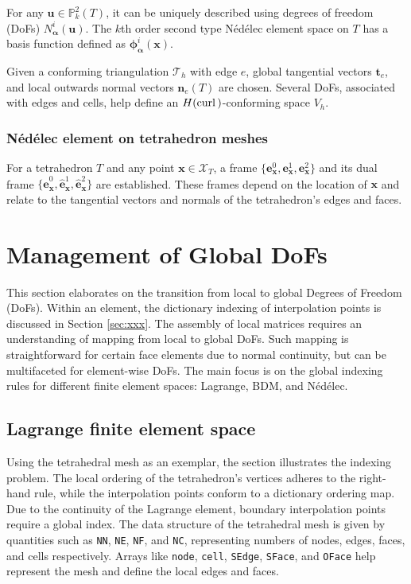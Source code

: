 \documentclass[12pt, a4paper]{article}
\newcommand{\bs}{\boldsymbol}
\newcommand{\curl}{{\rm curl\,}}
\begin{document}
For any \( \bs u \in \mathbb P_k^2(T) \), it can be uniquely described using degrees of freedom (DoFs) \( N^i_{\bs \alpha }(\bs u) \). The \( k \)th order second type N\'ed\'elec element space on \( T \) has a basis function defined as \( \bs{\phi}_{\bs \alpha}^i(\bs x) \).

Given a conforming triangulation \( \mathcal T_h \) with edge \( e \), global tangential vectors \( \bs t_e \), and local outwards normal vectors \( \bs n_e(T) \) are chosen. Several DoFs, associated with edges and cells, help define an \( H(\curl) \)-conforming space \( V_h \).

\subsubsection{N\'ed\'elec element on tetrahedron meshes}
For a tetrahedron \( T \) and any point \( \bs x \in \mathcal X_{T} \), a frame \( \{\bs e_{\boldsymbol x}^0, \bs e_{\bs x}^1, \bs e_{\bs x}^2\} \) and its dual frame \( \{\hat {\bs e}_{\bs x}^0, \hat{\bs e}_{\bs x}^1, \hat{\bs e}_{\bs x}^2\} \) are established. These frames depend on the location of \( \boldsymbol{x} \) and relate to the tangential vectors and normals of the tetrahedron's edges and faces.

\section{Management of Global DoFs}
This section elaborates on the transition from local to global Degrees of Freedom (DoFs). Within an element, the dictionary indexing of interpolation points is discussed in Section \ref{sec:xxx}. The assembly of local matrices requires an understanding of mapping from local to global DoFs. Such mapping is straightforward for certain face elements due to normal continuity, but can be multifaceted for element-wise DoFs. The main focus is on the global indexing rules for different finite element spaces: Lagrange, BDM, and N\'ed\'elec.

\subsection{Lagrange finite element space}
Using the tetrahedral mesh as an exemplar, the section illustrates the indexing problem. The local ordering of the tetrahedron's vertices adheres to the right-hand rule, while the interpolation points conform to a dictionary ordering map. Due to the continuity of the Lagrange element, boundary interpolation points require a global index. The data structure of the tetrahedral mesh is given by quantities such as \lstinline{NN}, \lstinline{NE}, \lstinline{NF}, and \lstinline{NC}, representing numbers of nodes, edges, faces, and cells respectively. Arrays like \lstinline{node}, \lstinline{cell}, \lstinline{SEdge}, \lstinline{SFace}, and \lstinline{OFace} help represent the mesh and define the local edges and faces. 
\end{document}
